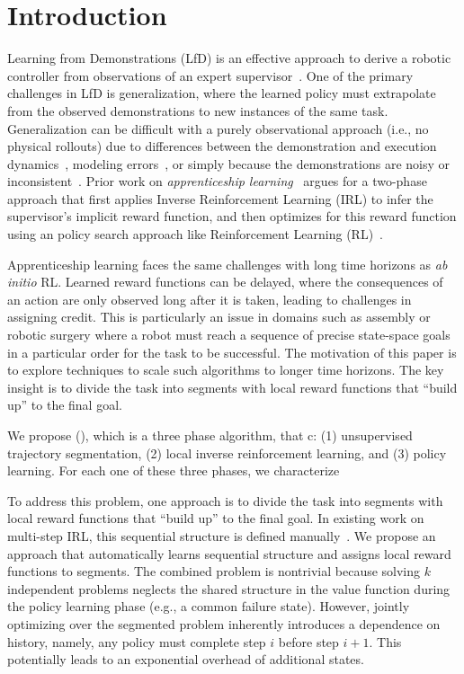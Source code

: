 \section{Introduction}
Learning from Demonstrations (LfD) is an effective approach to derive a robotic controller from observations of an expert supervisor~\cite{argall2009survey}.
One of the primary challenges in LfD is generalization, where the learned policy must extrapolate from the observed demonstrations to new instances of the same task.
Generalization can be difficult with a purely observational approach (i.e., no physical rollouts) due to differences between the demonstration and execution dynamics~\cite{abbeel2004apprenticeship}, modeling errors~\cite{ross2011reduction}, or simply because the demonstrations are noisy or inconsistent~\cite{krishnan2015tsc}.
Prior work on \emph{apprenticeship learning}~\cite{DBLP:conf/nips/KolterAN07, coates2008learning, abbeel2004apprenticeship} argues for a two-phase approach that first applies Inverse Reinforcement Learning (IRL) to infer the supervisor's implicit reward function, and then optimizes for this reward function using an policy search approach like Reinforcement Learning (RL)~\cite{ng2000algorithms, abbeel2004apprenticeship}.


Apprenticeship learning faces the same challenges with long time horizons as \emph{ab initio} RL.
Learned reward functions can be delayed, where the consequences of an action are only observed long after it is taken, leading to challenges in assigning credit.
This is particularly an issue in domains such as assembly or robotic surgery where a robot must reach a sequence of precise state-space goals in a particular order for the task to be successful.
The motivation of this paper is to explore techniques to scale such algorithms to longer time horizons.
The key insight is to divide the task into segments with local reward functions that ``build up'' to the final goal.

We propose \hirlfull (\hirl), which is a three phase algorithm, that c: (1) unsupervised trajectory segmentation, (2) local inverse reinforcement learning, and (3) policy learning.
For each one of these three phases, we characterize 






To address this problem, one approach is to divide the task into segments with local reward functions that ``build up'' to the final goal.
In existing work on multi-step IRL, this sequential structure is defined manually~\cite{DBLP:conf/nips/KolterAN07}.
We propose an approach that automatically learns sequential structure and assigns local reward functions to segments.
The combined problem is nontrivial because solving $k$ independent problems neglects the shared structure in the value function during the policy learning phase (e.g., a common failure state).
However, jointly optimizing over the segmented problem inherently introduces a dependence on history, namely, any policy must complete step $i$ before step $i+1$.
This potentially leads to an exponential overhead of additional states. 

